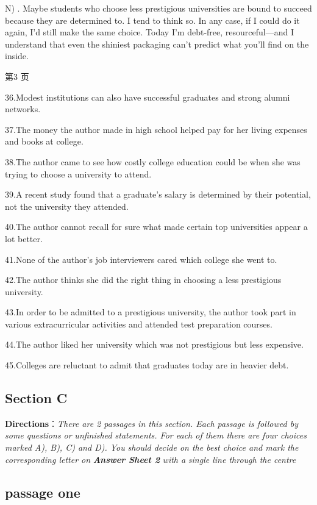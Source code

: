 \documentclass[UTF8,11pt]{ctexart}
\begin{document}
N) . Maybe students who choose less prestigious universities are bound to succeed because they are determined to. I tend to think so. In any case, if I could do it again, I’d still make the same choice. Today I’m debt-free, resourceful—and I understand that even the shiniest packaging can’t predict what you’ll find on the inside.


第3 页


36.Modest institutions can also have successful graduates and strong alumni networks.


37.The money the author made in high school helped pay for her living expenses and books at college.


38.The author came to see how costly college education could be when she was trying to choose a university to attend.


39.A recent study found that a graduate’s salary is determined by their potential, not the university they attended.


40.The author cannot recall for sure what made certain top universities appear a lot better.


41.None of the author’s job interviewers cared which college she went to.


42.The author thinks she did the right thing in choosing a less prestigious university.


43.In order to be admitted to a prestigious university, the author took part in various extracurricular activities and attended test preparation courses.


44.The author liked her university which was not prestigious but less expensive.


45.Colleges are reluctant to admit that graduates today are in heavier debt.


\subsection*{\textbf{Section C}}


\textbf{Directions}：\textit{There are 2 passages in this section. Each passage is followed by some questions or} \textit{unfinished statements. For each of them there are four choices marked A), B), C) and D). You} \textit{should decide on the best choice and mark the corresponding letter on}\textbf{\textit{ Answer Sheet 2}}\textit{ with a} \textit{single line through the centre}


\subsection*{\textbf{passage one}}
\end{document}
